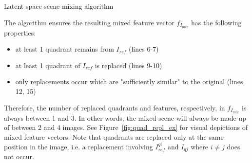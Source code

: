 \documentclass[12pt,a4paper]{article}
\begin{document}
\begin{algorithm}[H]
\DontPrintSemicolon
\LinesNumbered
{}
\caption{Latent space scene mixing algorithm}\label{alg:img_mixing_algo}
\end{algorithm}

The algorithm ensures the resulting mixed feature vector $f_{I_{mix}}$ has the following properties:
\begin{itemize}
   \item at least 1 quadrant remains from $I_{ref}$ (lines 6-7)
   \item at least 1 quadrant of $I_{ref}$ is replaced (lines 9-10)
   \item only replacements occur which are "sufficiently similar" to the original (lines 12, 15)
\end{itemize}
Therefore, the number of replaced quadrants and features, respectively, in $f_{I_{mix}}$ is always between 1 and 3. In other words, the mixed scene will always be made up of between 2 and 4 images. See Figure~\ref{fig:quad_repl_ex} for visual depictions of mixed feature vectors. Note that quadrants are replaced only at the same position in the image, i.e. a replacement involving $I^{qi}_{ref}$ and $I_{qj}$ where $i \neq j$ does not occur.



\end{document}
